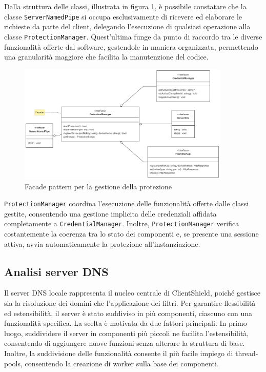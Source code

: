 \documentclass[12pt,a4paper,openright,twoside]{book}
\begin{document}
Dalla struttura delle classi, illustrata in figura \ref{fig:protezione-facade-pattern}, è possibile constatare che la classe \texttt{ServerNamedPipe} si occupa esclusivamente di ricevere ed elaborare le richieste da parte del client, delegando l'esecuzione di qualsiasi operazione alla classe \texttt{ProtectionManager}.
Quest'ultima funge da punto di raccordo tra le diverse funzionalità offerte dal software, gestendole in maniera organizzata, permettendo una granularità maggiore che facilita la manutenzione del codice.
\begin{figure}[h]
	\centering
	\includegraphics[width=0.9\textwidth]{figures/protezione-facade-pattern.png}
	\caption{Facade pattern per la gestione della protezione}
	\label{fig:protezione-facade-pattern}
\end{figure}
\texttt{ProtectionManager} coordina l'esecuzione delle funzionalità offerte dalle classi gestite, consentendo una gestione implicita delle credenziali affidata completamente a \texttt{CredentialManager}.
Inoltre, \texttt{ProtectionManager} verifica costantemente la coerenza tra lo stato dei componenti e, se presente una sessione attiva, avvia automaticamente la protezione all'instanziazione.


\subsection{Analisi server DNS}

Il server \gls{DNS} locale rappresenta il nucleo centrale di ClientShield, poiché gestisce sia la risoluzione dei domini che l'applicazione dei filtri.
Per garantire flessibilità ed estensibilità, il server è stato suddiviso in più componenti, ciascuno con una funzionalità specifica.
La scelta è motivata da due fattori principali.
In primo luogo, suddividere il server in componenti più piccoli ne facilita l'estensibilità, consentendo di aggiungere nuove funzioni senza alterare la struttura di base.
Inoltre, la suddivisione delle funzionalità consente il più facile impiego di thread-pools, consentendo la creazione di worker sulla base dei componenti.
\end{document}
